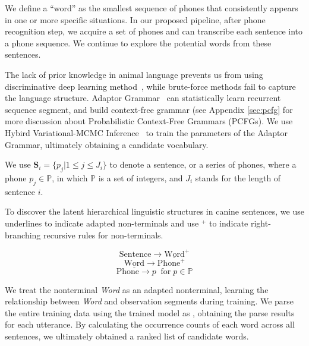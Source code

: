 We define a ``word'' as the smallest sequence of phones that consistently appears in 
one or more specific situations.
In our proposed pipeline,
after phone recognition step,
we acquire a set of phones and can transcribe each sentence into a phone sequence.
We continue to explore the potential words from these sentences.

The lack of prior knowledge in animal language prevents us from using discriminative deep learning method~\citep{baevski2021unsupervised},
while brute-force methods fail to capture the language structure.
Adaptor Grammar~\citep{johnson2006adaptor} can statistically learn recurrent sequence segment,
and build context-free grammar (see Appendix \ref{sec:pcfg} for more discussion about
Probabilistic Context-Free Grammars (PCFGs). We use Hybird Variational-MCMC Inference~\citep{zhai2014online} to train the 
parameters of the Adaptor Grammar, ultimately obtaining a candidate vocabulary.


We use $\mathbf{S}_{i}=\{p_{j}|1 \leq j \leq J_{i}\}$ to denote a sentence, or a
series of phones, where a phone $p_{j} \in \mathbb{P}$, in which $\mathbb{P}$ 
is a set of integers, and $J_{i}$ stands for the length of sentence $i$.

To discover the latent hierarchical linguistic structures in canine sentences, we use underlines to indicate adapted non-terminals and use ${}^{+}$ to indicate right-branching recursive 
rules for non-terminals.

$$\text{Sentence} \rightarrow \underline{\text{Word}}^{+} $$
$$\underline{\text{Word}} \rightarrow \text{Phone}^{+}$$
$$\text{Phone} \rightarrow p \; \; \text{for} \; p \in \mathbb{P} $$

We treat the nonterminal \textit{Word} as an adapted nonterminal,
learning the relationship between \textit{Word} and observation segments during training.
We parse the entire training data using the trained model as ,
obtaining the parse results for each utterance.
By calculating the occurrence counts of each word across all sentences, 
we ultimately obtained a ranked list of candidate words. 

